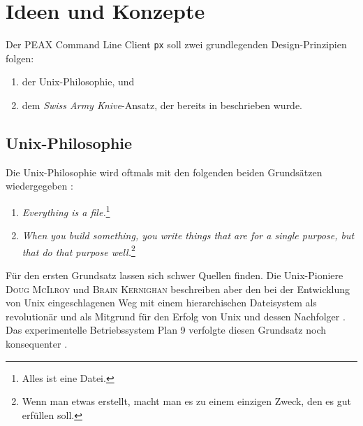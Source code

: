 \section{Ideen und Konzepte}

Der PEAX Command Line Client \texttt{px} soll zwei grundlegenden Design-Prinzipien folgen:

\begin{enumerate}
    \item der Unix-Philosophie, und
    \item dem \textit{Swiss Army Knive}-Ansatz, der bereits in  beschrieben wurde.
\end{enumerate}

\subsection{Unix-Philosophie}

Die Unix-Philosophie wird oftmals mit den folgenden beiden Grundsätzen wiedergegeben \cite[12:51]{the-code-linux}:

\begin{enumerate}
    \item \textit{Everything is a file.}\footnote{Alles ist eine Datei.}
    \item \textit{When you build something, you write things that are for a single purpose, but that do that purpose well.}\footnote{Wenn man etwas erstellt, macht man es zu einem einzigen Zweck, den es gut erfüllen soll.}
\end{enumerate}

Für den ersten Grundsatz lassen sich schwer Quellen finden. Die Unix-Pioniere \textsc{Doug McIlroy} und \textsc{Brain Kernighan} beschreiben aber den bei der Entwicklung von Unix eingeschlagenen Weg mit einem hierarchischen Dateisystem als revolutionär und als Mitgrund für den Erfolg von Unix und dessen Nachfolger \cite[Kapitel 4.1, S. 62-62, und Kapitel 9.1, S. 166]{unix-history-memoir}. Das experimentelle Betriebssystem Plan 9 verfolgte diesen Grundsatz noch konsequenter \cite[Kapitel 8.4, S. 161]{unix-history-memoir}.

